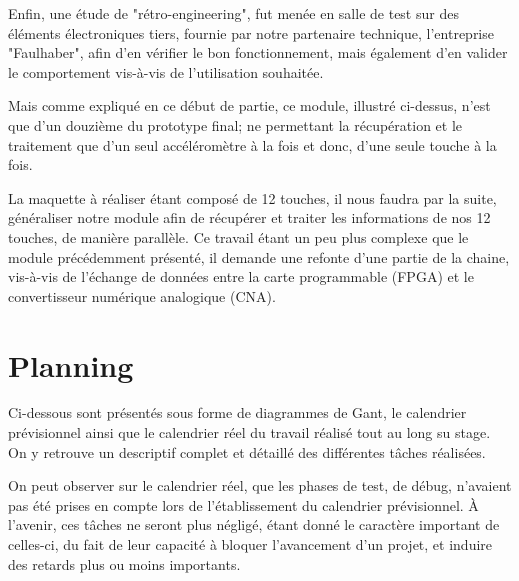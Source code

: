 \documentclass[french,a4paper,12pt]{report}
\begin{document}
	Enfin, une étude de "rétro-engineering", fut menée en salle de test sur des éléments électroniques tiers, fournie par notre partenaire technique, l'entreprise "Faulhaber", afin d'en vérifier le bon fonctionnement, mais également d'en valider le comportement vis-à-vis de l'utilisation souhaitée.
	
	Mais comme expliqué en ce début de partie, ce module, illustré ci-dessus, n'est que d'un douzième du prototype final; ne permettant la récupération et le traitement que d'un seul accéléromètre à la fois et donc, d'une seule touche à la fois.
	
	La maquette à réaliser étant composé de 12 touches, il nous faudra par la suite, généraliser notre module afin de récupérer et traiter les informations de nos 12 touches, de manière parallèle.
	Ce travail étant un peu plus complexe que le module précédemment présenté, il demande une refonte d'une partie de la chaine, vis-à-vis de l'échange de données entre la carte programmable (FPGA) et le convertisseur numérique analogique (CNA).
	
	\chapter{Planning}

	Ci-dessous sont présentés sous forme de diagrammes de Gant, le calendrier prévisionnel ainsi que le calendrier réel du travail réalisé tout au long su stage.
	On y retrouve un descriptif complet et détaillé des différentes tâches réalisées.
	
	On peut observer sur le calendrier réel, que les phases de test, de débug, n'avaient pas été prises en compte lors de l'établissement du calendrier prévisionnel.
	À l'avenir, ces tâches ne seront plus négligé, étant donné le caractère important de celles-ci, du fait de leur capacité à bloquer l'avancement d'un projet, et induire des retards plus ou moins importants.
	
	
	
	
	
		
	
	
	
	
%
%
	
\end{document}
